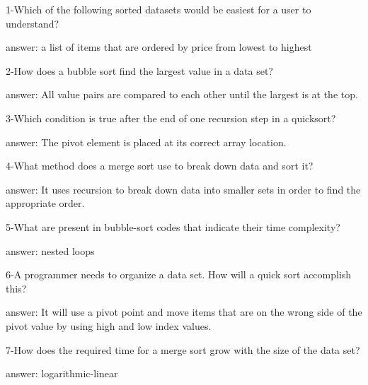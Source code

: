 1-Which of the following sorted datasets would be easiest for a user to understand?

answer: a list of items that are ordered by price from lowest to highest

2-How does a bubble sort find the largest value in a data set?

answer: All value pairs are compared to each other until the largest is at the top.

3-Which condition is true after the end of one recursion step in a quicksort?

answer: The pivot element is placed at its correct array location.

4-What method does a merge sort use to break down data and sort it?

answer: It uses recursion to break down data into smaller sets in order to find the appropriate order.

5-What are present in bubble-sort codes that indicate their time complexity?

answer: nested loops

6-A programmer needs to organize a data set. How will a quick sort accomplish this?

answer: It will use a pivot point and move items that are on the wrong side of the pivot value by using high and low index values.

7-How does the required time for a merge sort grow with the size of the data set?

answer: logarithmic-linear
